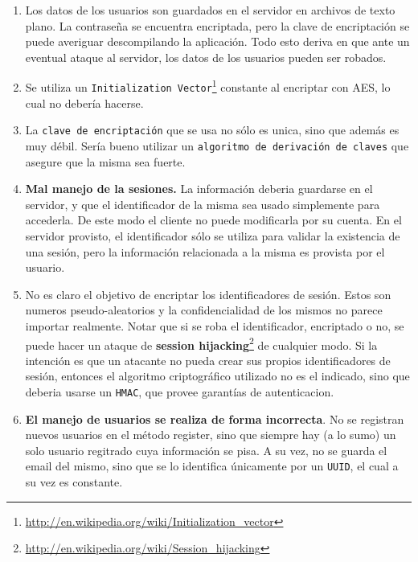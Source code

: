 \documentclass[11pt, a4paper, twoside]{article}
\begin{document}
\begin{enumerate}

\item Los datos de los usuarios son guardados en el servidor en archivos de texto plano. La contraseña se encuentra encriptada, pero la clave de encriptación se puede averiguar descompilando la aplicación. Todo esto deriva en que ante un eventual ataque al servidor, los datos de los usuarios pueden ser robados.

\item Se utiliza un \texttt{Initialization Vector}\footnote{\url{http://en.wikipedia.org/wiki/Initialization_vector}} constante al encriptar con AES, lo cual no debería hacerse.

\item La \texttt{clave de encriptación} que se usa no sólo es unica, sino que además es muy débil. Sería bueno utilizar un \texttt{algoritmo de derivación de claves} que asegure que la misma sea fuerte.

\item \textbf{Mal manejo de la sesiones.} La información deberia guardarse en el servidor, y que el identificador de la misma sea usado simplemente para accederla. De este modo el cliente no puede modificarla por su cuenta. En el servidor provisto, el identificador sólo se utiliza para validar la existencia de una sesión, pero la información relacionada a la misma es provista por el usuario.

\item No es claro el objetivo de encriptar los identificadores de sesión. Estos son numeros pseudo-aleatorios y la confidencialidad de los mismos no parece importar realmente. Notar que si se roba el identificador, encriptado o no, se puede hacer un ataque de \textbf{session hijacking}\footnote{\url{http://en.wikipedia.org/wiki/Session_hijacking}} de cualquier modo. Si la intención es que un atacante no pueda crear sus propios identificadores de sesión, entonces el algoritmo criptográfico utilizado no es el indicado, sino que deberia usarse un \texttt{HMAC}, que provee garantías de autenticacion.

\item \textbf{El manejo de usuarios se realiza de forma incorrecta}. No se registran nuevos usuarios en el método register, sino que siempre hay (a lo sumo) un solo usuario regitrado cuya información se pisa. A su vez, no se guarda el email del mismo, sino que se lo identifica únicamente por un \texttt{UUID}, el cual a su vez es constante.


\end{enumerate}
\end{document}
